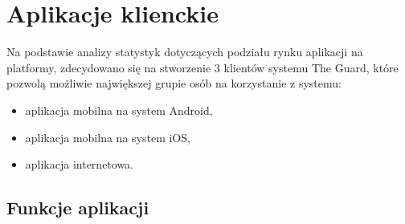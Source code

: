 \chapter{Aplikacje klienckie}

Na podstawie analizy statystyk dotyczących podziału rynku aplikacji na platformy\cite{stats}, zdecydowano się na stworzenie 3 klientów systemu The Guard, które pozwolą możliwie największej grupie osób na korzystanie z systemu:
\begin{itemize}
\item aplikacja mobilna na system Android,
\item aplikacja mobilna na system iOS,
\item aplikacja internetowa.
\end{itemize}

\section{Funkcje aplikacji}
